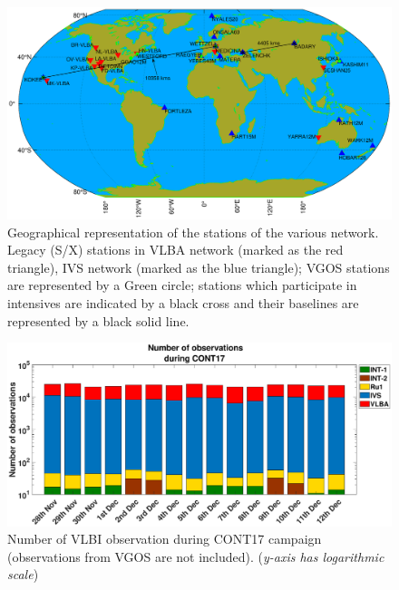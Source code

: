 \documentclass[smallextended]{svjour3}       %
\begin{document}
\begin{figure}
    \centering
    \includegraphics[scale=0.31]{VLBI_station_c.eps}
    \caption{Geographical representation of the stations of the various network. Legacy (S/X) stations in VLBA network (marked as the red triangle), IVS network (marked as the blue triangle); VGOS stations are represented by a Green circle; stations which participate in intensives are indicated by a black cross and their baselines are represented by a black solid line. \citep{rauteffect}}
    \label{fig:cont17stations}
\end{figure}
\begin{figure}
    \centering
    \includegraphics[scale=0.3]{noofobslog.eps}
    \caption{Number of VLBI observation during CONT17 campaign (observations from VGOS are not included). (\textit{y-axis has logarithmic scale})}
    \label{fig:noofobs}
\end{figure}
\end{document}
